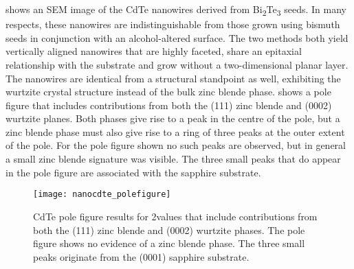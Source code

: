  shows an SEM image of the CdTe nanowires
derived from Bi\textsubscript{2}Te\textsubscript{3} seeds. In many respects, these nanowires
are indistinguishable from those grown using bismuth seeds
in conjunction with an alcohol-altered surface\cite{Neretina2007b}. The two
methods both yield vertically aligned nanowires that are highly
faceted, share an epitaxial relationship with the substrate and
grow without a two-dimensional planar layer. The nanowires
are identical from a structural standpoint as well, exhibiting
the wurtzite crystal structure instead of the bulk zinc blende phase. 
shows a pole figure that includes contributions from both
the (111) zinc blende and (0002) wurtzite planes. Both phases give rise to a peak in the
centre of the pole, but a zinc blende phase must also give rise to
a ring of three peaks at the outer extent of the pole. For the pole
figure shown no such peaks are observed, but in general a small
zinc blende signature was visible. The three small peaks that
do appear in the pole figure are associated with the sapphire
substrate.
\begin{figure}
    \centering
    \texttt{[image: nanocdte\_polefigure]}
    \caption[Pole figure of CdTe nanowires]{\label{fig:nanocdte_polefigure}CdTe pole figure results for 2\straighttheta{}values that include contributions from both the (111) zinc blende and (0002) wurtzite phases. The pole figure shows no evidence of a zinc blende phase. The three small peaks originate from the (0001) sapphire substrate.}
\end{figure}

